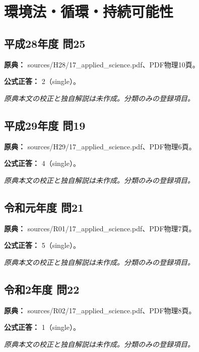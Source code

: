 \section{環境法・循環・持続可能性}

\subsection{平成28年度 問25}
\label{q:h28-reg-applied-25}

\noindent\textbf{原典：} sources/H28/17\_applied\_science.pdf、PDF物理10頁。

\textbf{公式正答：} 2（single）。

\par\textit{原典本文の校正と独自解説は未作成。分類のみの登録項目。}

\subsection{平成29年度 問19}
\label{q:h29-reg-applied-19}

\noindent\textbf{原典：} sources/H29/17\_applied\_science.pdf、PDF物理6頁。

\textbf{公式正答：} 4（single）。

\par\textit{原典本文の校正と独自解説は未作成。分類のみの登録項目。}

\subsection{令和元年度 問21}
\label{q:r01-reg-applied-21}

\noindent\textbf{原典：} sources/R01/17\_applied\_science.pdf、PDF物理7頁。

\textbf{公式正答：} 5（single）。

\par\textit{原典本文の校正と独自解説は未作成。分類のみの登録項目。}

\subsection{令和2年度 問22}
\label{q:r02-reg-applied-22}

\noindent\textbf{原典：} sources/R02/17\_applied\_science.pdf、PDF物理8頁。

\textbf{公式正答：} 1（single）。

\par\textit{原典本文の校正と独自解説は未作成。分類のみの登録項目。}

